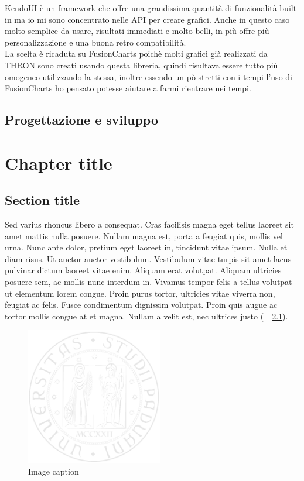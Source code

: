\documentclass[a4paper, 12pt, twoside, openright]{book}
\begin{document}
KendoUI è un framework che offre una grandissima quantità di funzionalità built-in ma io mi sono concentrato nelle API per creare grafici. Anche in questo caso molto semplice da usare, risultati immediati e molto belli, in più offre più personalizzazione e una buona retro compatibilità.\\
La scelta è ricaduta su FusionCharts poichè molti grafici già realizzati da THRON sono creati usando questa libreria, quindi risultava essere tutto più omogeneo utilizzando la stessa, inoltre essendo un pò stretti con i tempi l'uso di FusionCharts ho pensato potesse aiutare a farmi rientrare nei tempi.\\



\section{Progettazione e sviluppo}

\chapter{Chapter title} %
\thispagestyle{empty}

\section{Section title}
Sed varius rhoncus libero a consequat. Cras facilisis magna eget tellus laoreet sit amet mattis nulla posuere. Nullam magna est, porta a feugiat quis, mollis vel urna. Nunc ante dolor, pretium eget laoreet in, tincidunt vitae ipsum. Nulla et diam risus. Ut auctor auctor vestibulum. Vestibulum vitae turpis sit amet lacus pulvinar dictum laoreet vitae enim. Aliquam erat volutpat. Aliquam ultricies posuere sem, ac mollis nunc interdum in. Vivamus tempor felis a tellus volutpat ut elementum lorem congue. Proin purus tortor, ultricies vitae viverra non, feugiat ac felis. Fusce condimentum dignissim volutpat. Proin quis augue ac tortor mollis congue at et magna. Nullam a velit est, nec ultrices justo (\seename\ \figurename~\ref{unipd-logo}).

\begin{figure}[ht]
  \centering
  \includegraphics[height=6cm]{images/unipd-light.png}
  \caption{Image caption}\label{unipd-logo}
\end{figure}
\end{document}
